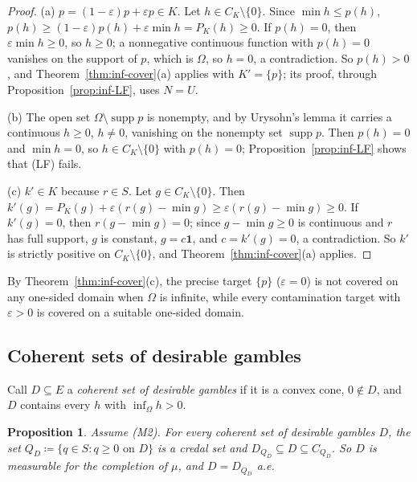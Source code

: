 \documentclass[11pt]{article}
\newcommand{\one}{\mathbf{1}}
\theoremstyle{plain}
\newtheorem{proposition}[theorem]{Proposition}
\theoremstyle{definition}
\theoremstyle{remark}
\begin{document}
\begin{proof}
(a) $p=(1-\varepsilon)p+\varepsilon p\in K$. Let $h\in C_K\setminus\{0\}$. Since $\min h\le
p(h)$, $p(h)\ge(1-\varepsilon)p(h)+\varepsilon\min h=P_K(h)\ge0$. If $p(h)=0$, then
$\varepsilon\min h\ge0$, so $h\ge0$; a nonnegative continuous function with $p(h)=0$
vanishes on the support of $p$, which is $\Omega$, so $h=0$, a contradiction. So $p(h)>0$,
and Theorem~\ref{thm:inf-cover}(a) applies with $K'=\{p\}$; its proof, through
Proposition~\ref{prop:inf-LF}, uses $N=U$.

(b) The open set $\Omega\setminus\operatorname{supp}p$ is nonempty, and by Urysohn's lemma
it carries a continuous $h\ge0$, $h\ne0$, vanishing on the nonempty set $\operatorname{supp}
p$. Then $p(h)=0$ and $\min h=0$, so $h\in C_K\setminus\{0\}$ with $p(h)=0$;
Proposition~\ref{prop:inf-LF} shows that (LF) fails.

(c) $k'\in K$ because $r\in S$. Let $g\in C_K\setminus\{0\}$. Then $k'(g)=P_K(g)+
\varepsilon(r(g)-\min g)\ge\varepsilon(r(g)-\min g)\ge0$. If $k'(g)=0$, then $r(g-\min
g)=0$; since $g-\min g\ge0$ is continuous and $r$ has full support, $g$ is constant, $g=c
\one$, and $c=k'(g)=0$, a contradiction. So $k'$ is strictly positive on $C_K\setminus
\{0\}$, and Theorem~\ref{thm:inf-cover}(a) applies.
\end{proof}

By Theorem~\ref{thm:inf-cover}(c), the precise target $\{p\}$ ($\varepsilon=0$) is not
covered on any one-sided domain when $\Omega$ is infinite, while every contamination
target with $\varepsilon>0$ is covered on a suitable one-sided domain.

\subsection{Coherent sets of desirable gambles}

Call $D\subseteq E$ a \emph{coherent set of desirable gambles} if it is a convex cone,
$0\notin D$, and $D$ contains every $h$ with $\inf_\Omega h>0$.

\begin{proposition}\label{prop:cdg}
Assume (M2). For every coherent set of desirable gambles $D$, the set $Q_D\coloneqq\{q\in S:
q\ge0\text{ on }D\}$ is a credal set and $D_{Q_D}\subseteq D\subseteq C_{Q_D}$. So $D$ is
measurable for the completion of $\mu$, and $D=D_{Q_D}$ a.e.
\end{proposition}
\end{document}
